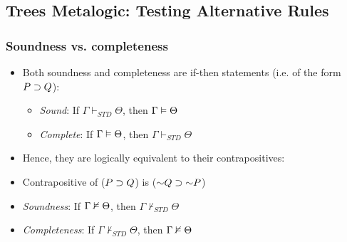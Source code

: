 \subsection{Trees Metalogic: Testing Alternative Rules}

\begin{frame}
\frametitle{Soundness vs. completeness}

\begin{itemize}[<+->]

\item Both soundness and completeness are if-then statements (i.e. of the form $P \supset Q$):

\begin{itemize}

\item \emph{Sound}: If $\Gamma \vdash_{STD} \Theta$, then $\Gamma \vDash \Theta$

\item \emph{Complete}: If $\Gamma \vDash \Theta$, then $\Gamma \vdash_{STD} \Theta$

\end{itemize}

\bigskip

\item Hence, they are logically equivalent to their contrapositives: 

\bi

\item Contrapositive of ($P \supset Q$) is ($\enot Q \eif \enot P$)

\item \emph{Soundness}: If $\Gamma \nvDash \Theta$, then $\Gamma \nvdash_{STD} \Theta$ 

\item \emph{Completeness}: If $\Gamma \nvdash_{STD} \Theta$, then $\Gamma \nvDash \Theta$

\ei 




\end{itemize}
\end{frame}

